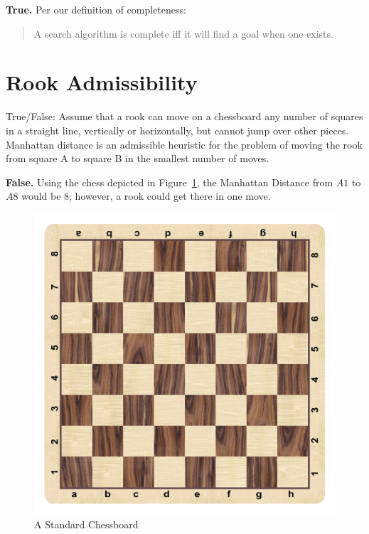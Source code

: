 \documentclass[12pt]{scrartcl}
\begin{document}
\textbf{True.} Per our definition of completeness:

\begin{quote}
    A search algorithm is complete iff it will find a goal when one exists.
\end{quote}

\section{Rook Admissibility}
\begin{statement}
    True/False: Assume that a rook can move on a chessboard any number of squares in a straight line, vertically or horizontally, but cannot jump over other pieces. Manhattan distance is an admissible heuristic for the problem of moving the rook from square A to square B in the smallest number of moves.
\end{statement}

\textbf{False.} Using the chess depicted in Figure~\ref{fig:chessboard}, the Manhattan Distance from $A1$ to $A8$ would be \num{8}; however, a rook could get there in one move.

\begin{figure}[h]
    \centering
    \includegraphics[width=.5\linewidth]{assets/chessboard.jpg}
    \caption{A Standard Chessboard}
    \label{fig:chessboard}
\end{figure}
\end{document}
